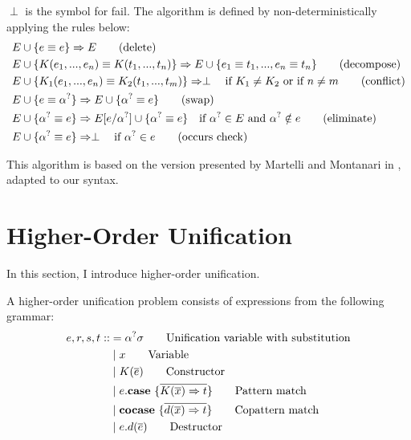 \documentclass[twoside,12pt,a4paper]{article}
\begin{document}
\begin{definition}
    $\perp$ is the symbol for fail.
    The algorithm is defined by non-deterministically applying the rules below:
    \begin{align*}
        E & \cup \{ e \equiv e\} \Rightarrow E \tag{delete}\\
        E & \cup \{K(e_1, ..., e_n) \equiv K(t_1, ..., t_n)\} \Rightarrow E \cup \{e_1 \equiv t_1, ..., e_n \equiv t_n\}\tag{decompose}\\
        E & \cup \{K_1(e_1,..., e_n) \equiv K_2(t_1, ..., t_m)\}  \Rightarrow \perp \quad\text{if $K_1 \neq K_2$ or if $n\neq m$} \tag{conflict}\\
        E & \cup \{e \equiv \alpha^?\} \Rightarrow E \cup \{\alpha^? \equiv e\}\tag{swap}\\ 
        E & \cup \{\alpha^? \equiv e\} \Rightarrow E[e/\alpha^?] \cup \{\alpha^? \equiv e\} \quad\text{if $\alpha^? \in E$ and $\alpha^? \notin e$}  \tag{eliminate}\\
        E & \cup \{\alpha^? \equiv e\}\Rightarrow \perp \quad \text{if $\alpha^? \in e$} \tag{occurs check} \label{a}
    \end{align*}
\end{definition}

This algorithm is based on the version presented by Martelli and Montanari in \cite{10.1145/357162.357169},
adapted to our syntax.

\section{Higher-Order Unification}\label{sec:Higher-Order Unification}

In this section, I introduce higher-order unification.

\begin{definition}
    A higher-order unification problem consists of expressions from the following grammar:
    \begin{align*}
        e,r,s,t  ::&= \alphaunifvar\sigma \tag*{Unification variable with substitution}\\ %
            &\partition x  \tag*{Variable} \\
            &\partition\constructor \tag*{Constructor} \\
            &\partition\patmatch  \tag*{Pattern match}\\
            &\partition\copatmatch  \tag*{Copattern match}\\
            &\partition\destructor  \tag*{Destructor}
    \end{align*}
\end{definition}
\end{document}
